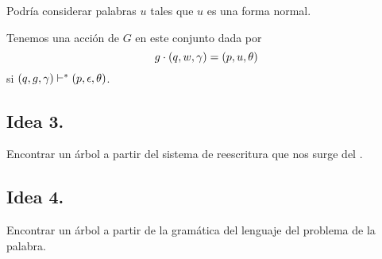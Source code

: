 \documentclass[12pt]{article}
\begin{document}
	Podría considerar palabras $u$ tales que $u$ es una forma normal.
	
	\begin{afirmacion}
		Tenemos una acción de $G$ en este conjunto dada por 
		\[
			g \cdot (q, w, \gamma) = (p,u,\theta) 
		\]
	si $(q,g,\gamma) \vdash^{*} (p,\epsilon,\theta)$.
	\end{afirmacion}


\subsection{Idea 3.}
	Encontrar un árbol a partir del sistema de reescritura que nos surge del \APND.

\subsection{Idea 4.}
	Encontrar un árbol a partir de la gramática del lenguaje del problema de la palabra.
\end{document}
